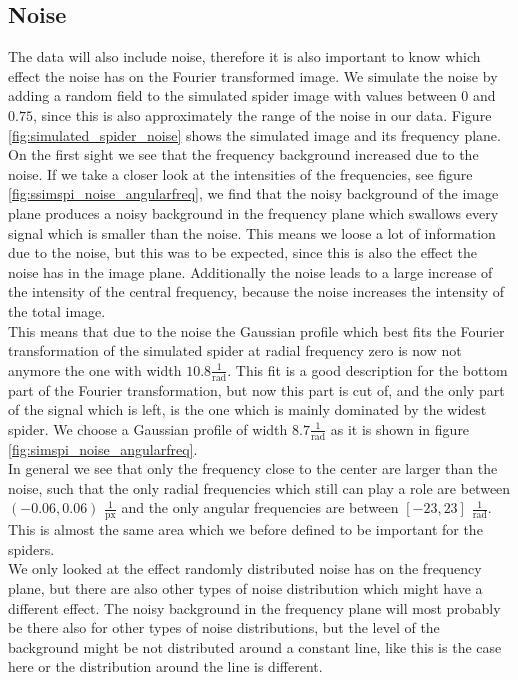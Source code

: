 \subsection{Noise}
\label{sec:noise}
The data will also include noise, therefore it is also important to know which effect the noise has on the Fourier transformed image. We simulate the noise by adding a random field to the simulated spider image with values between $0$ and $0.75$, since this is also approximately the range of the noise in our data. Figure \ref{fig:simulated_spider_noise} shows the simulated image and its frequency plane. On the first sight we see that the frequency background increased due to the noise. If we take a closer look at the intensities of the frequencies, see figure \ref{fig:ssimspi_noise_angularfreq}, we find that the noisy background of the image plane produces a noisy background in the frequency plane which swallows every signal which is smaller than the noise. This means we loose a lot of information due to the noise, but this was to be expected, since this is also the effect the noise has in the image plane. Additionally the noise leads to a large increase of the intensity of the central frequency, because the noise increases the intensity of the total image.\\
This means that due to the noise the Gaussian profile which best fits the Fourier transformation of the simulated spider at radial frequency zero is now not anymore the one with width $10.8 \frac{1}{\mathrm{rad}}$. This fit is a good description for the bottom part of the Fourier transformation, but now this part is cut of, and the only part of the signal which is left, is the one which is mainly dominated by the widest spider. We choose a Gaussian profile of width $8.7 \frac{1}{\mathrm{rad}}$ as it is shown in figure \ref{fig:simspi_noise_angularfreq}.\\
In general we see that only the frequency close to the center are larger than the noise, such that the only radial frequencies which still can play a role are between $(-0.06, 0.06)$ $\frac{1}{\mathrm{px}}$ and the only angular frequencies are between $[-23, 23]$ $\frac{1}{\mathrm{rad}}$. This is almost the same area which we before defined to be important for the spiders. \\
We only looked at the effect randomly distributed noise has on the frequency plane, but there are also other types of noise distribution which might have a different effect. The noisy background in the frequency plane will most probably be there also for other types of noise distributions, but the level of the background might be not distributed around a constant line, like this is the case here or the distribution around the line is different. 
